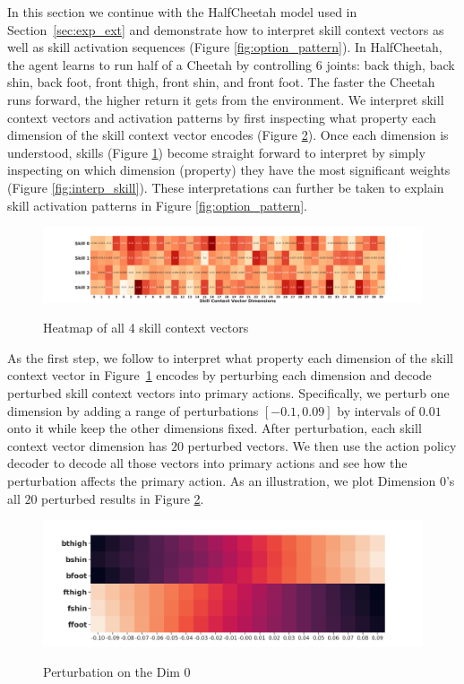 In this section we continue with the HalfCheetah model used in
Section~\ref{sec:exp_ext} and demonstrate how to interpret skill
context vectors as well as skill activation sequences (Figure
\ref{fig:option_pattern}). In HalfCheetah, the agent learns to
run half of a Cheetah by controlling 6 joints: back thigh, back
shin, back foot, front thigh, front shin, and front foot. The
faster the Cheetah runs forward, the higher return it gets from
the environment. We interpret skill context vectors and
activation patterns by first inspecting what property each
dimension of the skill context vector encodes (Figure
\ref{fig:first_dim_perturb}). Once each dimension is understood,
skills (Figure \ref{fig:all_skill_vectors}) become straight
forward to interpret by simply inspecting on which dimension
(property) they have the most significant weights (Figure
\ref{fig:interp_skill}). These interpretations can further be
taken to explain skill activation patterns in Figure
\ref{fig:option_pattern}.
\begin{figure}[h]
  \centering
  \includegraphics[width=1\linewidth]{./Part1/figures/all_skill_vectors.png}\\
  \caption{\label{fig:all_skill_vectors} Heatmap of all 4 skill
    context vectors}
\end{figure}

As the first step, we follow  to
interpret what property each dimension of the skill context
vector in Figure~\ref{fig:all_skill_vectors} encodes by
perturbing each dimension and decode perturbed skill context
vectors into primary actions. Specifically, we perturb one
dimension by adding a range of perturbations $[{-0.1}, 0.09]$ by
intervals of $0.01$ onto it while keep the other dimensions
fixed. After perturbation, each skill context vector dimension
has $20$ perturbed vectors. We then use the action policy decoder
to decode all those vectors into primary actions and see how the
perturbation affects the primary action. As an illustration, we
plot Dimension 0's all $20$ perturbed results in Figure
\ref{fig:first_dim_perturb}.
\begin{figure}[h]
  \centering
  \includegraphics[width=1\linewidth]{./Part1/figures/skill_heatmap.png}\\
  \caption{\label{fig:first_dim_perturb} Perturbation on the
    Dim 0}
\end{figure}

